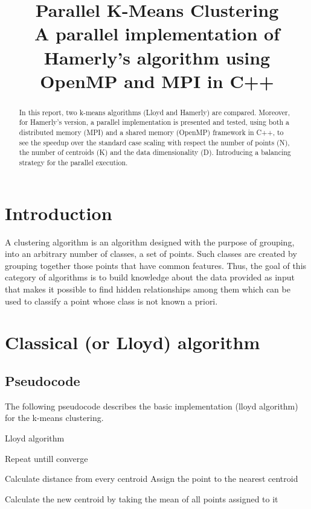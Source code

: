 \documentclass[conference]{IEEEtran}
\begin{document}
\title{Parallel K-Means Clustering\\
{\footnotesize A parallel implementation of Hamerly's algorithm using OpenMP and MPI in C++}
}

\author{
}

\maketitle

\begin{abstract}
In this report, two k-means algorithms (Lloyd and Hamerly) are compared. Moreover, for Hamerly's version, a parallel implementation is presented and tested, using both a distributed memory (MPI) and a shared memory (OpenMP) framework in C++, to see the speedup over the standard case scaling with respect the number of points (N), the number of centroids (K) and the data dimensionality (D). Introducing a balancing strategy for the parallel execution.
\end{abstract}

\section{Introduction}
A clustering algorithm is an algorithm designed with the purpose of grouping, into an arbitrary number of classes, a set of points. Such classes are created by grouping together those points that have common features. Thus, the goal of this category of algorithms is to build knowledge about the data provided as input that makes it possible to find hidden relationships among them which can be used to classify a point whose class is not known a priori.

\section{Classical (or Lloyd) algorithm}

\subsection{Pseudocode}
The following pseudocode describes the basic implementation (lloyd algorithm) for the k-means clustering.

\begin{algorithm}[H]
  \caption{Lloyd algorithm}
  \begin{algorithmic}
    \State Repeat untill converge

      \State Calculate distance from every centroid
      \State Assign the point to the nearest centroid
    \EndFor 

      \State Calculate the new centroid by taking the mean of all points assigned to it
    \EndFor 
  \end{algorithmic}
\end{algorithm}
\end{document}
